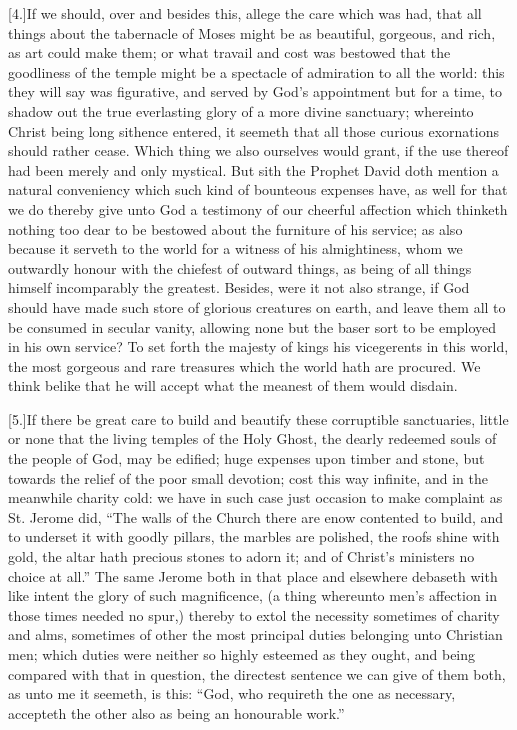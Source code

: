 [4.]If we should, over and besides this, allege the care which was had, that all things about the tabernacle of Moses might be as beautiful, gorgeous, and rich, as art could make them; or what travail and cost was bestowed that the goodliness of the temple might be a spectacle of admiration to all the world: this they will say was figurative, and served by God’s appointment but for a time, to shadow out the true everlasting glory of a more divine sanctuary; whereinto Christ being long sithence entered, it seemeth that all those curious exornations should rather cease. Which thing we also ourselves would grant, if the use thereof had been merely and only mystical. But sith the Prophet David doth mention a natural conveniency which such kind of bounteous expenses have, as well for that we do thereby give unto God a testimony of our cheerful affection which thinketh nothing too dear to be bestowed about the furniture of his service; as also because it serveth to the world for a witness of his almightiness, whom we outwardly honour with the chiefest of outward things, as being of all things himself incomparably the greatest. Besides, were it not also strange, if God should have made such store of glorious creatures on earth, and leave them all to be consumed in secular vanity, allowing none but the baser sort to be employed in his own service? To set forth the  majesty of kings his vicegerents in this world, the most gorgeous and rare treasures which the world hath are procured.
 We think belike that he will accept what the meanest of them would disdain.

[5.]If there be great care to build and beautify these corruptible sanctuaries, little or none that the living temples of the Holy Ghost, the dearly redeemed souls of the people of God, may be edified; huge expenses upon timber and stone, but towards the relief of the poor small devotion; cost this way infinite, and in the meanwhile charity cold: we have in such case just occasion to make complaint as St. Jerome did, “The walls of the Church there are enow contented to build, and to underset it with goodly pillars, the marbles are polished, the roofs shine with gold, the altar hath precious stones to adorn it; and of Christ’s ministers no choice at all.” The same Jerome both in that place and elsewhere debaseth with like intent the glory of such magnificence, (a thing whereunto men’s affection in those times needed no spur,) thereby to extol the necessity sometimes of charity and alms, sometimes of other the most principal duties belonging unto Christian men; which duties were neither so highly esteemed as they ought, and being compared with that in  question, the directest sentence we can give of them both, as unto me it seemeth, is this:
 “God, who requireth the one as necessary, accepteth the other also as being an honourable work.”


